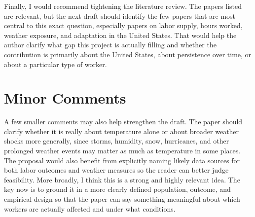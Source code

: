 \documentclass[12pt]{article}
\begin{document}
Finally, I would recommend tightening the literature review. The papers listed are relevant, but the next draft should identify the few papers that are most central to this exact question, especially papers on labor supply, hours worked, weather exposure, and adaptation in the United States. That would help the author clarify what gap this project is actually filling and whether the contribution is primarily about the United States, about persistence over time, or about a particular type of worker.


\section{Minor Comments}

A few smaller comments may also help strengthen the draft. The paper should clarify whether it is really about temperature alone or about broader weather shocks more generally, since storms, humidity, snow, hurricanes, and other prolonged weather events may matter as much as temperature in some places. The proposal would also benefit from explicitly naming likely data sources for both labor outcomes and weather measures so the reader can better judge feasibility. More broadly, I think this is a strong and highly relevant idea. The key now is to ground it in a more clearly defined population, outcome, and empirical design so that the paper can say something meaningful about which workers are actually affected and under what conditions.
\end{document}
